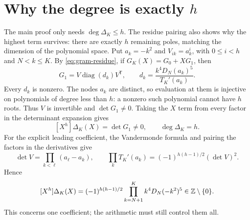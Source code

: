 \section{Why the degree is exactly \texorpdfstring{\(h\)}{h}}\label{sec:exact-degree}

The main proof only needs \(\deg\Delta_K\le h\). The residue pairing
also shows why the highest term survives: there are exactly \(h\)
remaining poles, matching the dimension of the polynomial space.
Put \(a_k=-k^2\) and \(V_{ik}=a_k^i\), with \(0\le i<h\) and \(N<k\le K\).
By \eqref{eq:gram-residue}, if \(G_K(X)=G_0+XG_1\), then
\[
 G_1=V\operatorname{diag}(d_k)V^{\mathsf T},\qquad
 d_k=\frac{k^4D_N(a_k)^5}{T_K'(a_k)}.
\]
Every \(d_k\) is nonzero. The nodes \(a_k\) are distinct, so evaluation
at them is injective on polynomials of degree less than \(h\):
a nonzero such polynomial cannot have \(h\) roots. Thus \(V\) is
invertible and \(\det G_1\ne0\). Taking the \(X\) term from every factor
in the determinant expansion gives
\[
 [X^h]\Delta_K(X)=\det G_1\ne0,\qquad \deg\Delta_K=h.
\]
For the explicit leading coefficient, the Vandermonde formula and
pairing the factors in the derivatives give
\[
 \det V=\prod_{k<\ell}(a_\ell-a_k),\qquad
 \prod_k T_K'(a_k)=(-1)^{h(h-1)/2}(\det V)^2.
\]
Hence
\[
 [X^h]\Delta_K(X)
 =(-1)^{h(h-1)/2}\prod_{k=N+1}^K k^4D_N(-k^2)^5
 \in\mathbb Z\setminus\{0\}.
\]
This concerns one coefficient; the arithmetic must still control them all.
